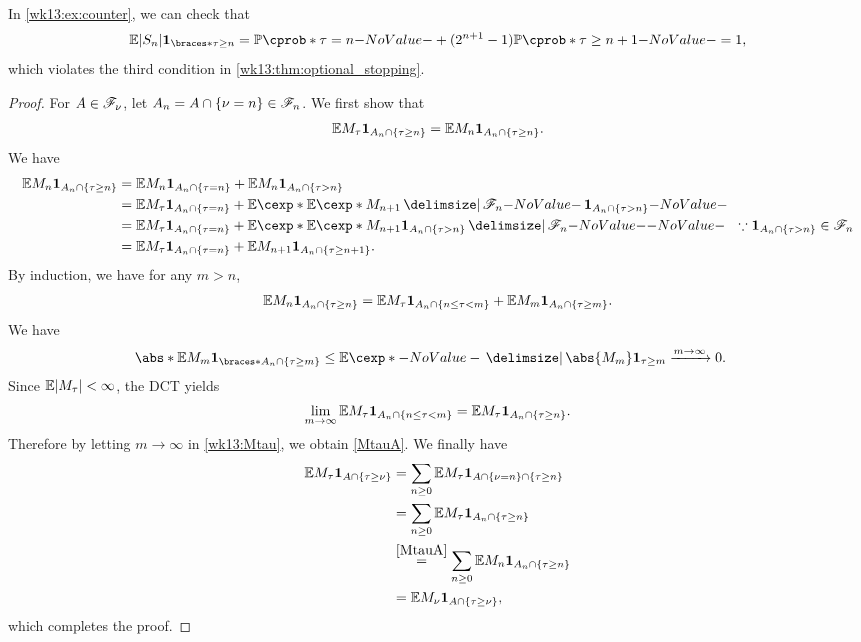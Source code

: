 \documentclass[12pt]{article}
\begin{document}
In \cref{wk13:ex:counter}, we can check that 
\begin{align*}
\E |S_n|\indicator{\tau\geq n} = \P(\tau=n) + (2^{n+1}-1)\P(\tau\geq n+1)= 1,
\end{align*}
which violates the third condition in \cref{wk13:thm:optional_stopping}.

\begin{proof}
For $A \in \mathscr{F}_\nu$, let $A_n = A \cap \{\nu = n\} \in \mathscr{F}_n $.  We first show that 
\begin{align}\label{MtauA}
\E M_\tau \indicatore{A_n \cap \{\tau \geq n\}} = \E M_n \indicatore{A_n \cap \{\tau \geq n\}}.
\end{align}
We have
\begin{align*}
\E M_n \indicatore{A_n \cap \{\tau \geq n\}}
&= \E M_n \indicatore{A_n \cap \{\tau = n\}} + \E M_n \indicatore{A_n \cap \{\tau > n\}} \\
&= \E M_\tau \indicatore{A_n \cap \{\tau = n\}} + \E[ {\E[M_{n+1} \given \scF_n]}\, \indicatore{A_n \cap \{\tau > n\}}] \\
&= \E M_\tau \indicatore{A_n \cap \{\tau = n\}} + \E[ {\E[M_{n+1}\indicatore{A_n \cap \{\tau > n\}} \given \scF_n]} ]\ \ \because \indicatore{A_n \cap \{\tau > n\}} \in \scF_n\\
&= \E M_\tau \indicatore{A_n \cap \{\tau = n\}} + \E M_{n+1} \indicatore{A_n \cap \{\tau \geq n+1\}}.
\end{align*}
By induction, we have for any $m>n$,
\begin{align}
\E M_n \indicatore{A_n \cap \{\tau \geq n\}}
= \E M_\tau \indicatore{A_n \cap \{n \leq \tau < m\}} + \E M_m \indicatore{A_n \cap \{\tau \geq m\}}.\label{wk13:Mtau}
\end{align}
We have
\begin{align*}
&\abs*{\E M_m \indicator{A_n \cap \{\tau \geq m\}}} \leq \E \abs{M_m} \indicatore{\tau \geq m} \xrightarrow{m\to\infty} 0.
\end{align*}
Since $\E |M_\tau| < \infty$, the DCT yields
\begin{align*}
\lim_{m \to \infty} \E M_\tau \indicatore{A_n \cap \{n \leq \tau < m\}}
= \E M_\tau \indicatore{A_n \cap \{\tau \geq n\}}.
\end{align*}
Therefore by letting $m\to\infty$ in \cref{wk13:Mtau}, we obtain \cref{MtauA}. We finally have
\begin{align*}
\E M_\tau \indicatore{A \cap \{\tau \geq \nu\}}
&= \sum_{n \geq 0} \E M_\tau \indicatore{A \cap \{\nu = n\} \cap \{\tau \geq n\}} \\
&= \sum_{n \geq 0} \E M_\tau \indicatore{A_n \cap \{\tau \geq n\}} \\
&\eqa{\cref{MtauA}} \sum_{n \geq 0} \E M_n \indicatore{A_n \cap \{\tau \geq n\}} \\
&= \E M_\nu \indicatore{A \cap \{\tau \geq \nu\}},
\end{align*}
which completes the proof.
\end{proof}
\end{document}
